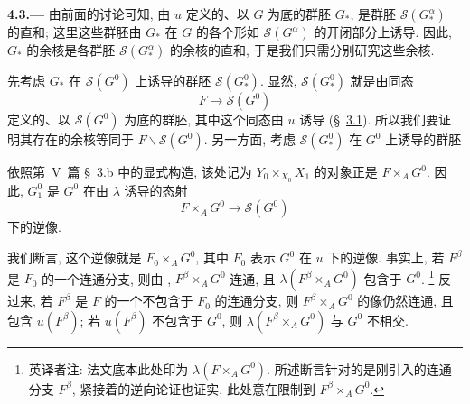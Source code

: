 
\medskip
{}\label{par:sga3-VIA-4.3}%
\noindent\textbf{4.3.---}
由前面的讨论可知, 由 \(u\) 定义的、以 \(G\) 为底的群胚 \(G_*\),
是群胚 \(\mathscr S(G^\alpha_*)\) 的直和;
这里这些群胚由 \(G_*\) 在 \(G\) 的各个形如 \(\mathscr S(G^\alpha)\)
的开闭部分上诱导. 因此, \(G_*\) 的余核是各群胚
\(\mathscr S(G^\alpha_*)\) 的余核的直和,
于是我们只需分别研究这些余核.

先考虑 \(G_*\) 在 \(\mathscr S(G^0)\) 上诱导的群胚
\(\mathscr S(G^0_*)\). 显然, \(\mathscr S(G^0_*)\)
就是由同态
\[
  F\longrightarrow\mathscr S(G^0)
\]
定义的、以 \(\mathscr S(G^0)\) 为底的群胚,
其中这个同态由 \(u\) 诱导 (\S~\hyperref[par:sga3-VIA-3.1]{3.1}).
所以我们要证明其存在的余核等同于 \(F\backslash\mathscr S(G^0)\).
另一方面, 考虑 \(\mathscr S(G^0_*)\) 在 \(G^0\) 上诱导的群胚
\begin{center}
  \label{diag:sga3-VIA-4.3-G0-groupoid}%
\end{center}
依照第~V~篇 \S~3.b 中的显式构造,
该处记为 \(Y_0\times_{X_0}X_1\) 的对象正是 \(F\times_A G^0\).
因此, \(G^0_1\) 是 \(G^0\) 在由 \(\lambda\) 诱导的态射
\[
  F\times_A G^0\longrightarrow\mathscr S(G^0)
\]
下的逆像.

我们断言, 这个逆像就是 \(F_0\times_A G^0\),
其中 \(F_0\) 表示 \(G^0\) 在 \(u\) 下的逆像.
事实上, 若 \(F^\beta\) 是 \(F_0\) 的一个连通分支,
则由 ,
\(F^\beta\times_A G^0\) 连通,
且 \(\lambda(F^\beta\times_A G^0)\) 包含于 \(G^0\).%
\begingroup
\renewcommand{\thefootnote}{\fnsymbol{footnote}}%
\footnote[1]{英译者注: 法文底本此处印为 \(\lambda(F\times_A G^0)\).
所述断言针对的是刚引入的连通分支 \(F^\beta\),
紧接着的逆向论证也证实, 此处意在限制到 \(F^\beta\times_A G^0\).}%
\endgroup
反过来, 若 \(F^\beta\) 是 \(F\) 的一个不包含于 \(F_0\) 的连通分支,
则 \(F^\beta\times_A G^0\) 的像仍然连通, 且包含 \(u(F^\beta)\);
若 \(u(F^\beta)\) 不包含于 \(G^0\),
则 \(\lambda(F^\beta\times_A G^0)\) 与 \(G^0\) 不相交.

